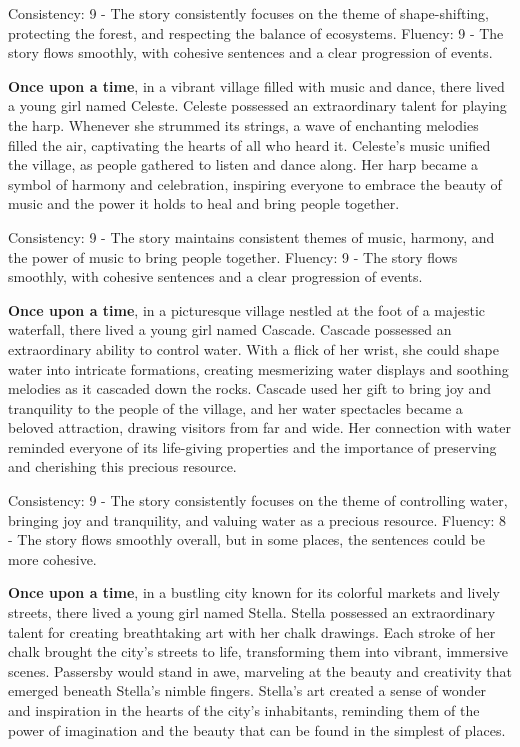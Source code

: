 \documentclass{article}
\begin{document}
Consistency: 9 - The story consistently focuses on the theme of shape-shifting, protecting the forest, and respecting the balance of ecosystems.
Fluency: 9 - The story flows smoothly, with cohesive sentences and a clear progression of events.

\textbf{Once upon a time}, in a vibrant village filled with music and dance, there lived a young girl named Celeste. Celeste possessed an extraordinary talent for playing the harp. Whenever she strummed its strings, a wave of enchanting melodies filled the air, captivating the hearts of all who heard it. Celeste's music unified the village, as people gathered to listen and dance along. Her harp became a symbol of harmony and celebration, inspiring everyone to embrace the beauty of music and the power it holds to heal and bring people together.

Consistency: 9 - The story maintains consistent themes of music, harmony, and the power of music to bring people together.
Fluency: 9 - The story flows smoothly, with cohesive sentences and a clear progression of events.

\textbf{Once upon a time}, in a picturesque village nestled at the foot of a majestic waterfall, there lived a young girl named Cascade. Cascade possessed an extraordinary ability to control water. With a flick of her wrist, she could shape water into intricate formations, creating mesmerizing water displays and soothing melodies as it cascaded down the rocks. Cascade used her gift to bring joy and tranquility to the people of the village, and her water spectacles became a beloved attraction, drawing visitors from far and wide. Her connection with water reminded everyone of its life-giving properties and the importance of preserving and cherishing this precious resource.

Consistency: 9 - The story consistently focuses on the theme of controlling water, bringing joy and tranquility, and valuing water as a precious resource.
Fluency: 8 - The story flows smoothly overall, but in some places, the sentences could be more cohesive.

\textbf{Once upon a time}, in a bustling city known for its colorful markets and lively streets, there lived a young girl named Stella. Stella possessed an extraordinary talent for creating breathtaking art with her chalk drawings. Each stroke of her chalk brought the city's streets to life, transforming them into vibrant, immersive scenes. Passersby would stand in awe, marveling at the beauty and creativity that emerged beneath Stella's nimble fingers. Stella's art created a sense of wonder and inspiration in the hearts of the city's inhabitants, reminding them of the power of imagination and the beauty that can be found in the simplest of places.
\end{document}
